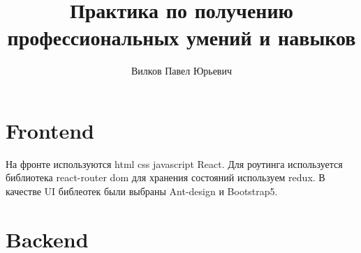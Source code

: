 \documentclass[a4paper, 14pt]{scrartcl}
\author {Вилков Павел Юрьевич}
\title {Практика по получению профессиональных умений и навыков}
\theoremstyle{plain}
\theoremstyle{definition}
\begin{document}
	\section{Frontend}
	На фронте используются html css javascript React. Для роутинга используется библиотека react-router dom для хранения состояний используем redux. В качестве UI библеотек были выбраны Ant-design и Bootstrap5.
	\pagebreak
	\section{Backend}
\end{document}

